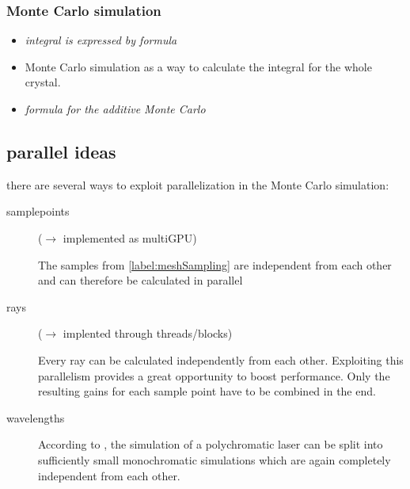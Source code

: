\subsubsection{Monte Carlo simulation}
\label{label:monteCarlo}

\begin{itemize}

  \item \textit{integral is expressed by formula} \cite[Daniel's Thesis]{}

  \item Monte Carlo simulation as a way to calculate the integral for the whole
    crystal.

  \item \textit{formula for the additive Monte Carlo}

\end{itemize}




\subsection{parallel ideas}

there are several ways to exploit parallelization in the Monte Carlo simulation:

\begin{description}

  \item[samplepoints] ($\rightarrow$ implemented as multiGPU)

    The samples from \ref{label:meshSampling} are independent from each other
    and can therefore be calculated in parallel

  \item[rays] ($\rightarrow$ implented through threads/blocks)
    
    Every ray can be calculated independently from each other.
    Exploiting this parallelism provides a great opportunity to boost
    performance. Only the resulting gains for each sample point have to be
    combined in the end.

  \item[wavelengths]

    According to \label{label:monteCarlo}, the simulation of a polychromatic
    laser can be split into sufficiently small monochromatic simulations which
    are again completely independent from each other.

\end{description}


